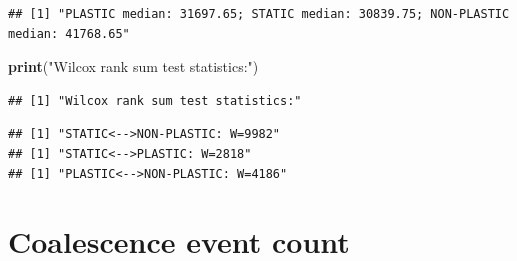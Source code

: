 \documentclass[]{book}
\newenvironment{Shaded}{\begin{snugshade}}{\end{snugshade}}
\newcommand{\ControlFlowTok}[1]{\textcolor[rgb]{0.13,0.29,0.53}{\textbf{#1}}}
\newcommand{\DataTypeTok}[1]{\textcolor[rgb]{0.13,0.29,0.53}{#1}}
\newcommand{\DecValTok}[1]{\textcolor[rgb]{0.00,0.00,0.81}{#1}}
\newcommand{\KeywordTok}[1]{\textcolor[rgb]{0.13,0.29,0.53}{\textbf{#1}}}
\newcommand{\NormalTok}[1]{#1}
\newcommand{\OperatorTok}[1]{\textcolor[rgb]{0.81,0.36,0.00}{\textbf{#1}}}
\newcommand{\OtherTok}[1]{\textcolor[rgb]{0.56,0.35,0.01}{#1}}
\newcommand{\StringTok}[1]{\textcolor[rgb]{0.31,0.60,0.02}{#1}}
\begin{document}
\begin{verbatim}
## [1] "PLASTIC median: 31697.65; STATIC median: 30839.75; NON-PLASTIC median: 41768.65"
\end{verbatim}

\begin{Shaded}
\begin{Highlighting}[]
\KeywordTok{print}\NormalTok{(}\StringTok{"Wilcox rank sum test statistics:"}\NormalTok{)}
\end{Highlighting}
\end{Shaded}

\begin{verbatim}
## [1] "Wilcox rank sum test statistics:"
\end{verbatim}

\begin{Shaded}
\end{Shaded}

\begin{verbatim}
## [1] "STATIC<-->NON-PLASTIC: W=9982"
## [1] "STATIC<-->PLASTIC: W=2818"
## [1] "PLASTIC<-->NON-PLASTIC: W=4186"
\end{verbatim}

\hypertarget{coalescence-event-count}{%
\section{Coalescence event count}\label{coalescence-event-count}}
\end{document}
